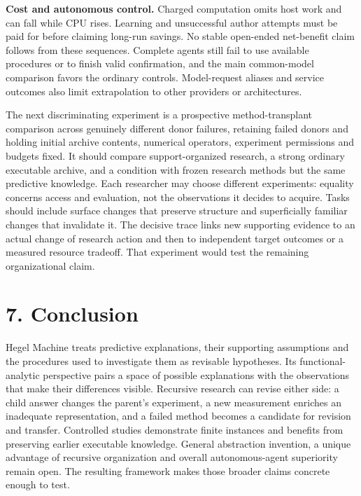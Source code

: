 \documentclass[11pt,a4paper]{article}
\begin{document}
\textbf{Cost and autonomous control.} Charged computation omits host work and can fall while CPU rises. Learning and unsuccessful author attempts must be paid for before claiming long-run savings. No stable open-ended net-benefit claim follows from these sequences. Complete agents still fail to use available procedures or to finish valid confirmation, and the main common-model comparison favors the ordinary controls. Model-request aliases and service outcomes also limit extrapolation to other providers or architectures.


The next discriminating experiment is a prospective method-transplant comparison across genuinely different donor failures, retaining failed donors and holding initial archive contents, numerical operators, experiment permissions and budgets fixed. It should compare support-organized research, a strong ordinary executable archive, and a condition with frozen research methods but the same predictive knowledge. Each researcher may choose different experiments: equality concerns access and evaluation, not the observations it decides to acquire. Tasks should include surface changes that preserve structure and superficially familiar changes that invalidate it. The decisive trace links new supporting evidence to an actual change of research action and then to independent target outcomes or a measured resource tradeoff. That experiment would test the remaining organizational claim.


\section*{7. Conclusion}

Hegel Machine treats predictive explanations, their supporting assumptions and the procedures used to investigate them as revisable hypotheses. Its functional-analytic perspective pairs a space of possible explanations with the observations that make their differences visible. Recursive research can revise either side: a child answer changes the parent's experiment, a new measurement enriches an inadequate representation, and a failed method becomes a candidate for revision and transfer. Controlled studies demonstrate finite instances and benefits from preserving earlier executable knowledge. General abstraction invention, a unique advantage of recursive organization and overall autonomous-agent superiority remain open. The resulting framework makes those broader claims concrete enough to test.
\end{document}
